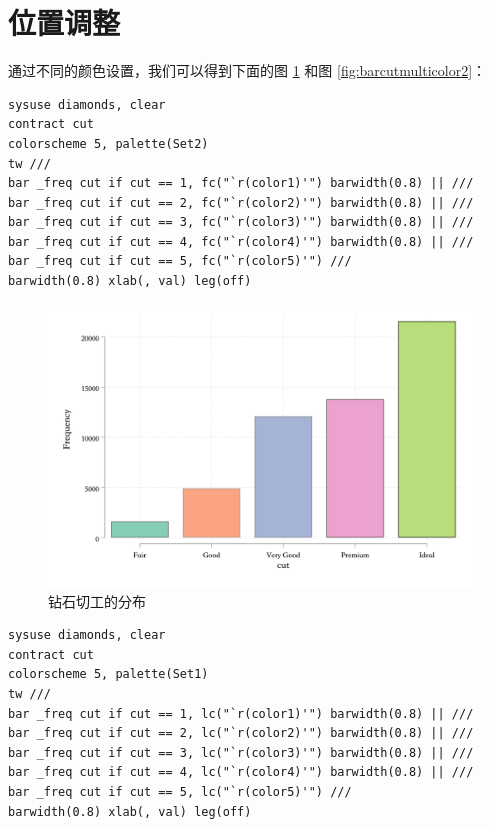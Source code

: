 \section{位置调整}

通过不同的颜色设置，我们可以得到下面的图 \ref{fig:barcutmulticolor} 和图 \ref{fig:barcutmulticolor2}：

\begin{lstlisting}
sysuse diamonds, clear
contract cut
colorscheme 5, palette(Set2)
tw ///
bar _freq cut if cut == 1, fc("`r(color1)'") barwidth(0.8) || ///
bar _freq cut if cut == 2, fc("`r(color2)'") barwidth(0.8) || ///
bar _freq cut if cut == 3, fc("`r(color3)'") barwidth(0.8) || ///
bar _freq cut if cut == 4, fc("`r(color4)'") barwidth(0.8) || ///
bar _freq cut if cut == 5, fc("`r(color5)'") ///
barwidth(0.8) xlab(, val) leg(off)
\end{lstlisting}

\begin{figure}[htbp]
  \centering
  \includegraphics[width=\textwidth]{assets/barcutmulticolor.png}
  \caption{钻石切工的分布}\label{fig:barcutmulticolor}
\end{figure}

\begin{lstlisting}
sysuse diamonds, clear
contract cut
colorscheme 5, palette(Set1)
tw ///
bar _freq cut if cut == 1, lc("`r(color1)'") barwidth(0.8) || ///
bar _freq cut if cut == 2, lc("`r(color2)'") barwidth(0.8) || ///
bar _freq cut if cut == 3, lc("`r(color3)'") barwidth(0.8) || ///
bar _freq cut if cut == 4, lc("`r(color4)'") barwidth(0.8) || ///
bar _freq cut if cut == 5, lc("`r(color5)'") ///
barwidth(0.8) xlab(, val) leg(off)
\end{lstlisting}

